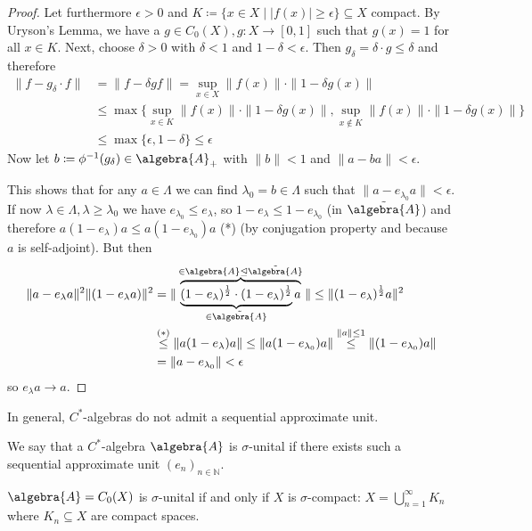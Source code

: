 \documentclass[a4paper]{article}
\begin{document}
\begin{proof}
	Let furthermore $\epsilon > 0$ and $K \coloneq \{x \in X \mid |f(x)| \geq \epsilon \} \subseteq X$ compact.
	By Uryson's Lemma, we have a $g \in C_0(X), g: X \to [0,1]$ such that $g(x) = 1$ for all $x \in K$.
	Next, choose $\delta > 0$ with $\delta < 1$ and $1 - \delta < \epsilon$.
	Then $g_\delta = \delta \cdot g \leq \delta$ and therefore
	\begin{align*}
		\|f - g_\delta \cdot f\| &= \|f - \delta g f \| = \sup_{x \in X} \|f(x)\| \cdot \| 1 - \delta g(x) \| \\ &\leq \max \{ \sup_{x \in K} \|f(x)\| \cdot \|1 - \delta g(x) \|, \sup_{x \notin K} \|f(x)\| \cdot \|1 - \delta g(x) \| \} \\ &\leq \max\{ \epsilon, 1 - \delta \}  \leq \epsilon
	\end{align*}
	Now let $b \coloneq \phi^{-1}(g_\delta) \in \algebra{A}_+$ with $\|b \| < 1$ and $\| a - ba \| < \epsilon$.

	This shows that for any $a \in \Lambda$ we can find $\lambda_0 = b \in \Lambda$ such that $\|a - e_{\lambda_0} a \| < \epsilon$.
	If now $\lambda \in \Lambda, \lambda \geq \lambda_0$ we have $e_{\lambda_0} \leq e_\lambda$, so $1 - e_\lambda \leq 1 - e_{\lambda_0}$ (in $\tilde{\algebra{A}}$) and therefore $a (1 - e_\lambda ) a \leq a (1 - e_{\lambda_0}) a$ (*) (by conjugation property and because $a$ is self-adjoint).
	But then
	\begin{align*}
		\|a - e_\lambda a\|^2 \|(1 - e_\lambda a)\|^2 &= \|\overbrace{\underbrace{(1 - e_\lambda)^{\frac{1}{2}} \cdot (1-e_\lambda)^{\frac{1}{2}}}_{\in \tilde{\algebra{A}}} a}^{\in \algebra{A} \trianglelefteq \tilde{\algebra{A}}} \|
		\leq \|(1 - e_\lambda)^{\frac{1}{2}} a \|^2 \\
		&\overset{(*)}{\leq} \| a (1 - e_\lambda) a \| \leq \| a (1 - e_{\lambda_0}) a \| \overset{\|a\| \leq 1}{\leq} \|(1 - e_{\lambda_0}) a \|\\
		&= \|a - e_{\lambda_0}\| < \epsilon
	\end{align*}
	so $e_\lambda a \to a$.
\end{proof}

\begin{definition}
	In general, $C^*$-algebras do not admit a sequential approximate unit.

	We say that a $C^*$-algebra $\algebra{A}$ is $\sigma$-unital if there exists such a sequential approximate unit $(e_n)_{n \in \mathds{N}}$.
\end{definition}

\begin{example}
	$\algebra{A} = C_0(X)$ is $\sigma$-unital if and only if $X$ is $\sigma$-compact: $X = \bigcup_{n = 1}^\infty K_n$ where $K_n \subseteq X$ are compact spaces.
\end{example}
\end{document}
